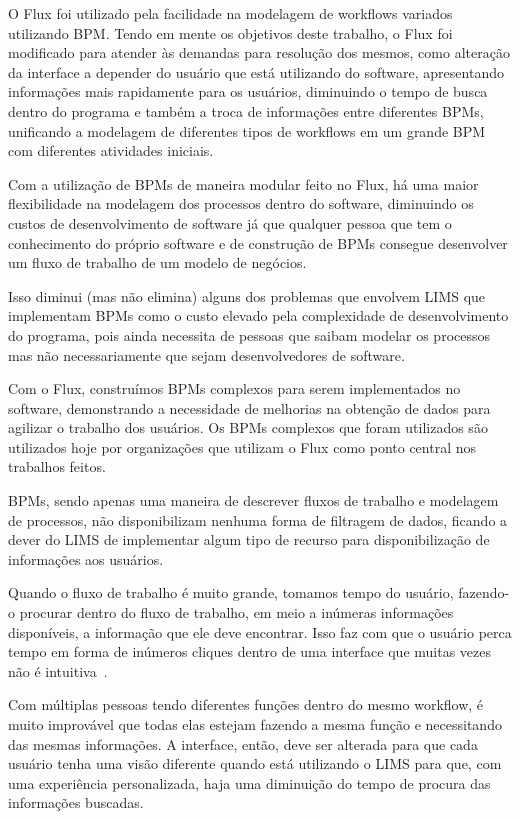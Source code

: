 O Flux foi utilizado pela facilidade na modelagem de workflows variados utilizando BPM. Tendo em mente os objetivos deste trabalho, o Flux foi modificado para atender às demandas para resolução dos mesmos, como alteração da interface a depender do usuário que está utilizando do software, apresentando informações mais rapidamente para os usuários, diminuindo o tempo de busca dentro do programa e também a troca de informações entre diferentes BPMs, unificando a modelagem de diferentes tipos de workflows em um grande BPM com diferentes atividades iniciais.


Com a utilização de BPMs de maneira modular feito no Flux, há uma maior flexibilidade na modelagem dos processos dentro do software, diminuindo os custos de desenvolvimento de software já que qualquer pessoa que tem o conhecimento do próprio software e de construção de BPMs consegue desenvolver um fluxo de trabalho de um modelo de negócios.

Isso diminui (mas não elimina) alguns dos problemas que envolvem LIMS que implementam BPMs como o custo elevado pela complexidade de desenvolvimento do programa, pois ainda necessita de pessoas que saibam modelar os processos mas não necessariamente que sejam desenvolvedores de software.


Com o Flux, construímos BPMs complexos para serem implementados no software, demonstrando a necessidade de melhorias na obtenção de dados para agilizar o trabalho dos usuários. Os BPMs complexos que foram utilizados são utilizados hoje por organizações que utilizam o Flux como ponto central nos trabalhos feitos.

BPMs, sendo apenas uma maneira de descrever fluxos de trabalho e modelagem de processos, não disponibilizam nenhuma forma de filtragem de dados, ficando a dever do LIMS de implementar algum tipo de recurso para disponibilização de informações aos usuários.

Quando o fluxo de trabalho é muito grande, tomamos tempo do usuário, fazendo-o procurar dentro do fluxo de trabalho, em meio a inúmeras informações disponíveis, a informação que ele deve encontrar. Isso faz com que o usuário perca tempo em forma de inúmeros cliques dentro de uma interface que muitas vezes não é intuitiva~\cite{OvationIncNeeded:LIMS}.

Com múltiplas pessoas tendo diferentes funções dentro do mesmo workflow, é muito improvável que todas elas estejam fazendo a mesma função e necessitando das mesmas informações. A interface, então, deve ser alterada para que cada usuário tenha uma visão diferente quando está utilizando o LIMS para que, com uma experiência personalizada, haja uma diminuição do tempo de procura das informações buscadas.

